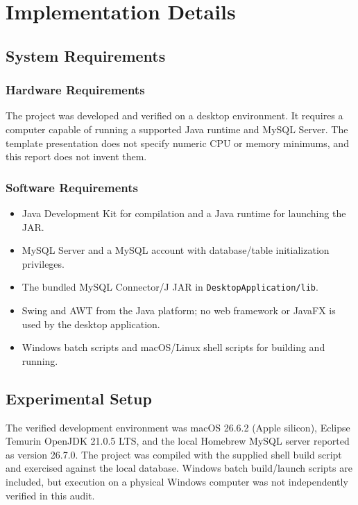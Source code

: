 \documentclass[12pt,a4paper]{report}
\begin{document}
\chapter{Implementation Details}
\section{System Requirements}
\subsection{Hardware Requirements}
The project was developed and verified on a desktop environment. It requires a computer capable of running a supported Java runtime and MySQL Server. The template presentation does not specify numeric CPU or memory minimums, and this report does not invent them.

\subsection{Software Requirements}
\begin{itemize}[leftmargin=*]
  \item Java Development Kit for compilation and a Java runtime for launching the JAR.
  \item MySQL Server and a MySQL account with database/table initialization privileges.
  \item The bundled MySQL Connector/J JAR in \texttt{DesktopApplication/lib}.
  \item Swing and AWT from the Java platform; no web framework or JavaFX is used by the desktop application.
  \item Windows batch scripts and macOS/Linux shell scripts for building and running.
\end{itemize}

\section{Experimental Setup}
The verified development environment was macOS 26.6.2 (Apple silicon), Eclipse Temurin OpenJDK 21.0.5 LTS, and the local Homebrew MySQL server reported as version 26.7.0. The project was compiled with the supplied shell build script and exercised against the local database. Windows batch build/launch scripts are included, but execution on a physical Windows computer was not independently verified in this audit.
\end{document}
